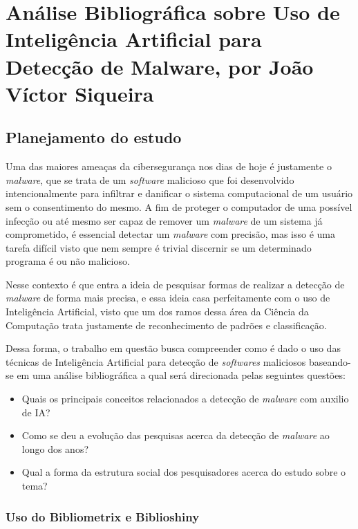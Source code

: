 \chapter{Análise Bibliográfica sobre Uso de Inteligência Artificial para Detecção de Malware, por João Víctor Siqueira}

\section{Planejamento do estudo}
\label{StrawHat972:PlanEst}

Uma das maiores ameaças da cibersegurança nos dias de hoje é justamente o \textit{malware}, que se trata de um \textit{software} malicioso que foi desenvolvido intencionalmente para infiltrar e danificar o sistema computacional de um usuário sem o consentimento do mesmo. A fim de proteger o computador de uma possível infecção ou até mesmo ser capaz de remover um \textit{malware} de um sistema já comprometido, é essencial detectar um \textit{malware} com precisão, mas isso é uma tarefa difícil visto que nem sempre é trivial discernir se um determinado programa é ou não malicioso. 

Nesse contexto é que entra a ideia de pesquisar formas de realizar a detecção de \textit{malware} de forma mais precisa, e essa ideia casa perfeitamente com o uso de Inteligência Artificial, visto que um dos ramos dessa área da Ciência da Computação trata justamente de reconhecimento de padrões e classificação.

Dessa forma, o trabalho em questão busca compreender como é dado o uso das técnicas de Inteligência Artificial para detecção de \textit{softwares} maliciosos baseando-se em uma análise bibliográfica a qual será direcionada pelas seguintes questões:

\begin{itemize}
    \item Quais os principais conceitos relacionados a detecção de \textit{malware} com auxilio de IA?
    \item Como se deu a evolução das pesquisas acerca da detecção de \textit{malware} ao longo dos anos?
    \item Qual a forma da estrutura social dos pesquisadores acerca do estudo sobre o tema?
\end{itemize}

\subsection{Uso do Bibliometrix e Biblioshiny}

